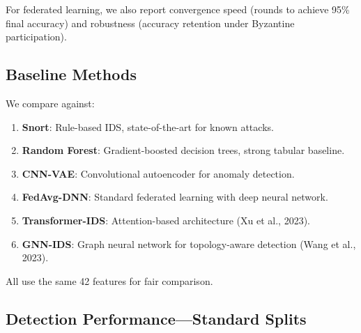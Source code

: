 \documentclass[preprint,12pt]{elsarticle}
\begin{document}
For federated learning, we also report convergence speed (rounds to achieve 95\% final accuracy) and robustness (accuracy retention under Byzantine participation).

\subsection{Baseline Methods}

We compare against:

\begin{enumerate}[leftmargin=1.3em]
    \item \textbf{Snort}: Rule-based IDS, state-of-the-art for known attacks.
    \item \textbf{Random Forest}: Gradient-boosted decision trees, strong tabular baseline.
    \item \textbf{CNN-VAE}: Convolutional autoencoder for anomaly detection.
    \item \textbf{FedAvg-DNN}: Standard federated learning with deep neural network.
    \item \textbf{Transformer-IDS}: Attention-based architecture (Xu et al., 2023).
    \item \textbf{GNN-IDS}: Graph neural network for topology-aware detection (Wang et al., 2023).
\end{enumerate}

All use the same 42 features for fair comparison.

\subsection{Detection Performance---Standard Splits}
\end{document}
